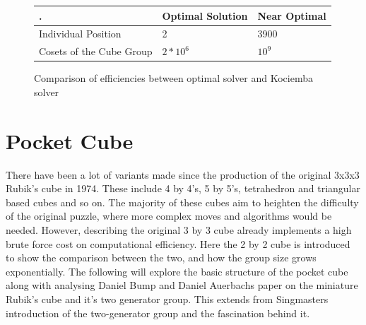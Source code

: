 \documentclass{article}
\newcounter{lem}[section]\setcounter{lem}{0}
\begin{document}
\begin{figure}
\begin{center}
    \begin{tabular}{ |p{5cm}| p{4cm}| p{4cm}|}
    \hline
    . & Optimal Solution & Near Optimal \\ \hline
    Individual Position & 2 & 3900\\ \hline
	Cosets of the Cube Group & $2*10^6$  & $10^9$\\ \hline
    \end{tabular}
\end{center}
\caption{Comparison of efficiencies between optimal solver and Kociemba solver}
\label{:thistletab}
\end{figure}

\newpage
\section{Pocket Cube}

\begin{figure}[h]
\centering
  \TwoCubeSolved%
\end{figure}

There have been a lot of variants made since the production of the original 3x3x3 Rubik's cube in 1974. These include 4 by 4's, 5 by 5's, tetrahedron and triangular based cubes and so on. The majority of these cubes aim to heighten the difficulty of the original puzzle, where more complex moves and algorithms would be needed. However, describing the original 3 by 3 cube already implements a high brute force cost on computational efficiency. Here the 2 by 2 cube is introduced to show the comparison between the two, and how the group size grows exponentially. The following will explore the basic structure of the pocket cube along with analysing Daniel Bump and Daniel Auerbachs paper on the miniature Rubik's cube and it's two generator group. This extends from Singmasters introduction of the two-generator group and the fascination behind it.
\end{document}
